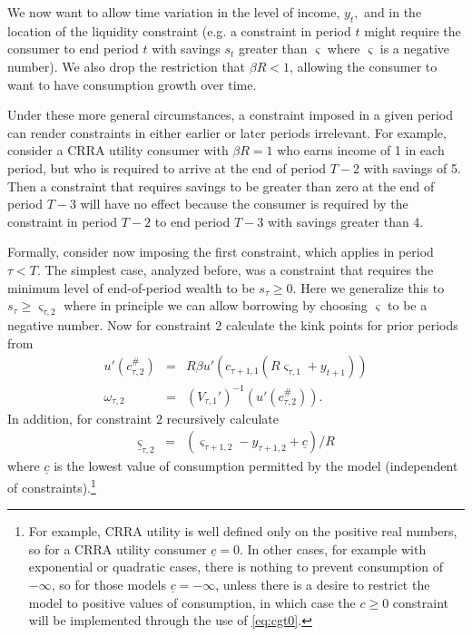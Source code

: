 \documentclass[titlepage]{\econtex}
\providecommand{\wAlt}{\omega}
\providecommand{\sConst}{\varsigma}
\begin{document}
We now want to allow time variation in the level of income,
${y}_{t},$ and in the location of the liquidity constraint
(e.g$.$ a constraint in period $t$ might require the consumer to
end period $t$ with savings $s_{t}$ greater than $\sConst$ where
$\sConst$ is a negative number).  We also drop the restriction that
$\beta R < 1$, allowing the consumer to want to have consumption growth over time.

Under these more general circumstances, a constraint imposed in a
given period can render constraints in either earlier or later periods
irrelevant.  For example, consider a CRRA utility consumer with
$\beta R=1$ who earns income of 1 in each
period, but who is required to arrive at the end of period $T-2$ with
savings of 5.  Then a constraint that requires savings to be greater
than zero at the end of period $T-3$ will have no effect because
the consumer is required by the constraint in period
$T-2$ to end period $T-3$ with savings greater than 4.


Formally, consider now imposing the first constraint, which applies in
period $\tau < T$.  The simplest case, analyzed before, was a
constraint that requires the minimum level of end-of-period wealth
to be $s_{\tau} \geq 0$.  Here we generalize this to $s_{\tau} \geq
\sConst_{\tau,2}$ where in principle we can allow borrowing by choosing
$\sConst$ to be a negative number.  Now for constraint $2$ calculate the kink points for prior periods from
\begin{eqnarray}
  \label{eq:5}
  u'(c_{\tau,2}^{\#}) & = & R\beta u'(c_{\tau+1,1}(R\sConst_{\tau,1}+{y}_{t+1}))
\\ \wAlt_{\tau,2} & = & (V_{\tau,1}')^{-1}(u'(c_{\tau,2}^{\#})).
\end{eqnarray}
In addition, for constraint $2$ recursively calculate
\begin{eqnarray}
\underline{\sConst}_{\tau,2} & = & (\sConst_{\tau+1,2}-{y}_{\tau+1,2}+\underline{c})/R  \label{eq:cgt0}
\end{eqnarray}
where $\underline{c}$ is the lowest value of consumption permitted
by the model (independent of constraints).\footnote{For example, CRRA utility
is well defined only on the positive real numbers, so for a CRRA
utility consumer $\underline{c}=0$.  In other cases, for example with exponential or quadratic
cases, there is nothing to prevent consumption of $-\infty$, so for
those models $\underline{c}=-\infty$, unless there is a desire to
restrict the model to positive values of consumption, in which case
the $c\geq 0$ constraint will be implemented through the use
of \eqref{eq:cgt0}.}
\end{document}
